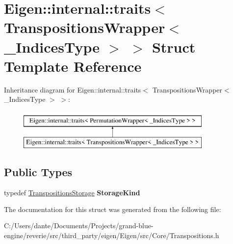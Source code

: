 \hypertarget{struct_eigen_1_1internal_1_1traits_3_01_transpositions_wrapper_3_01___indices_type_01_4_01_4}{}\section{Eigen\+::internal\+::traits$<$ Transpositions\+Wrapper$<$ \+\_\+\+Indices\+Type $>$ $>$ Struct Template Reference}
\label{struct_eigen_1_1internal_1_1traits_3_01_transpositions_wrapper_3_01___indices_type_01_4_01_4}
Inheritance diagram for Eigen\+::internal\+::traits$<$ Transpositions\+Wrapper$<$ \+\_\+\+Indices\+Type $>$ $>$\+:\begin{figure}[H]
\begin{center}
\leavevmode
\includegraphics[height=2.000000cm]{struct_eigen_1_1internal_1_1traits_3_01_transpositions_wrapper_3_01___indices_type_01_4_01_4}
\end{center}
\end{figure}
\subsection*{Public Types}
\begin{DoxyCompactItemize}
\item 
\mbox{\label{struct_eigen_1_1internal_1_1traits_3_01_transpositions_wrapper_3_01___indices_type_01_4_01_4_aea036f22fc1651d176a90241e96ae4d9}} 
typedef \mbox{\hyperlink{struct_eigen_1_1_transpositions_storage}{Transpositions\+Storage}} {\bfseries Storage\+Kind}
\end{DoxyCompactItemize}


The documentation for this struct was generated from the following file\+:\begin{DoxyCompactItemize}
\item 
C\+:/\+Users/dante/\+Documents/\+Projects/grand-\/blue-\/engine/reverie/src/third\+\_\+party/eigen/\+Eigen/src/\+Core/Transpositions.\+h\end{DoxyCompactItemize}
